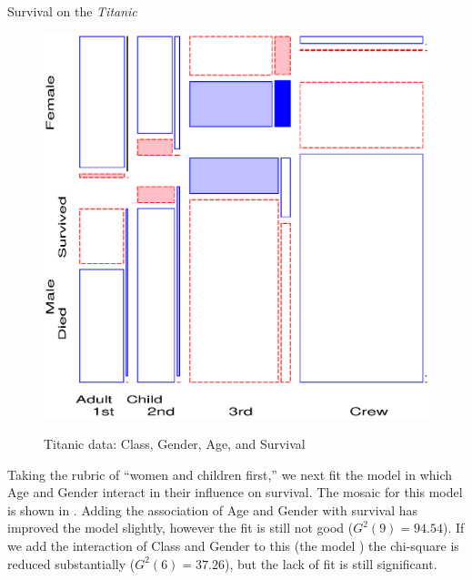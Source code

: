 \begin{Example}[titanic]{Survival on the \emph{Titanic}}
\begin{figure}[htb]
\begin{subfigmatrix}{2}
{  \includegraphics{ch4/fig/mostitanic4}
 }
 \end{subfigmatrix}
 \caption[Titanic data: Class, Gender, Age, and Survival]{Titanic data: Class, Gender, Age, and Survival}\label{fig:mostitanic3-4}
\end{figure}
%

Taking the rubric of ``women and children first,'' we next fit the
model  in which Age and Gender interact in their influence
on survival.  The mosaic for this model is shown in .
Adding the association of Age and Gender with survival has
improved the model slightly, however the fit is still not good ($G^2 (9) = 94.54$).
If we add the interaction of Class and Gender to this
(the model ) the \LR{} chi-square is reduced
substantially ($G^2 (6) = 37.26$), but the lack of fit is still
significant.


\end{Example}
